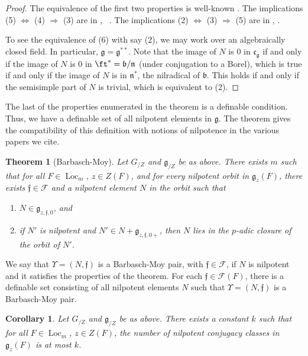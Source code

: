 \documentclass[12pt]{amsart}
\newcommand{\op}[1]{\operatorname{#1}}
\def\Y{\Upsilon}
\def\s{{\mathfrak{f}}}
\newcommand{\cF}{\mathcal{F}}
\newcommand{\fg}{\mathfrak{g}}
\newcommand{\fb}{\mathfrak{b}}
\newcommand{\fn}{\mathfrak{n}}
\newcommand{\fc}{\mathfrak{c}}
\theoremstyle{plain}
\newtheorem{theorem}[thm]{Theorem}
\newtheorem{cor}[thm]{Corollary}
\theoremstyle{definition}
\begin{document}
\begin{proof} The equivalence of the first two properties is
  well-known \cite[15.3]{humphries}.  The implications (5) $\Leftrightarrow$
  (4) $\Rightarrow$ (3) are in \cite{debacker:nilp},
  ~\cite[2.5.1]{adler-debacker:bt-lie}.  The implications (2)
  $\Leftrightarrow$ (3) $\Rightarrow$ (5) are in \cite[3.5]{mcninch},
  \cite[4.1,Prop 4]{mcninch}.

To see the equivalence of (6) with say (2), we may work over an
algebraically closed field. In particular, $\fg = \fg^{**}$.  Note that the image of
$N$ is $0$ in $\fc_{\fg}$ if and only if the image of $N$ is $0$ in
$\ft^* = \fb/\fn$ (under conjugation to a Borel), which is true if
and only if the image of $N$ is in $\fn^*$, the nilradical of $\fb$.
This holds if and only if the semisimple part of $N$ is trivial, which
is equivalent to (2).
\end{proof}

The last of the properties enumerated in the theorem is a definable
condition.  Thus, we have a definable set of all nilpotent elements in
$\fg$.  The theorem gives the compatibility of this definition with
notions of nilpotence in the various papers we cite.

\begin{theorem}[Barbasch-Moy]\label{thm:bm} 
  Let $G_{/Z}$ and $\fg_{/Z}$ be as above.  There exists $m$ such that
  for all $F\in \op{Loc}_m$, $z\in Z(F)$, and for every nilpotent
  orbit in $\fg_z(F)$, there exists $\s\in \cF$ and a nilpotent
  element $N$ in the orbit such that
\begin{enumerate}
   \item $N\in \fg_{z,\s,0}$, and
   \item if $N'$ is nilpotent and $N'\in N + \fg_{z,\s,0+}$, then $N$
     lies in the $p$-adic closure of the orbit of $N'$.
\end{enumerate}
\end{theorem}

We say that $\Y=(N,\s)$ is a Barbasch-Moy pair, with $\s\in \cF$, if $N$
is nilpotent and it satisfies the properties of the theorem.  For each
$\s\in \cF(F)$, there is a definable set consisting of all nilpotent
elements $N$ such that $\Y=(N,\s)$ is a
Barbasch-Moy pair.

\begin{cor}\label{thm:nilbound}  Let $G_{/Z}$ and $\fg_{/Z}$ be as above.  
There exists a constant $k$ such that for all $F\in \op{Loc}_m$, $z\in
Z(F)$, the number of nilpotent conjugacy classes in $\fg_z(F)$ is at
most $k$.
\end{cor}
\end{document}
